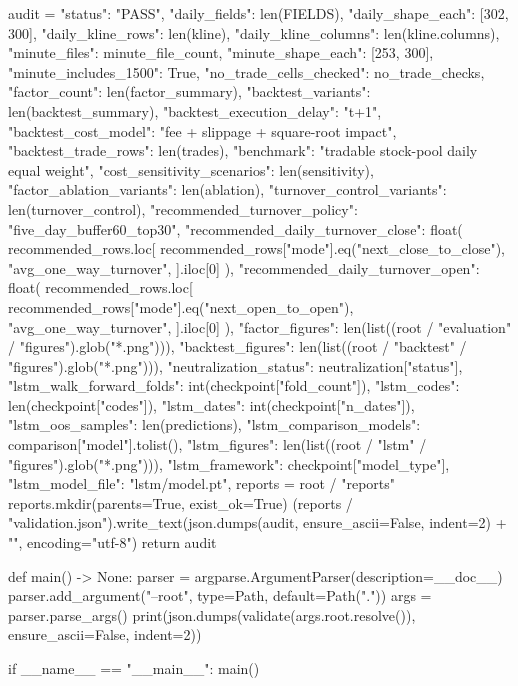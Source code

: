 \documentclass[UTF8,a4paper,fontset=fandol]{ctexart}
\begin{document}
\begin{ProjectCode}
    audit = {
        "status": "PASS",
        "daily_fields": len(FIELDS),
        "daily_shape_each": [302, 300],
        "daily_kline_rows": len(kline),
        "daily_kline_columns": len(kline.columns),
        "minute_files": minute_file_count,
        "minute_shape_each": [253, 300],
        "minute_includes_1500": True,
        "no_trade_cells_checked": no_trade_checks,
        "factor_count": len(factor_summary),
        "backtest_variants": len(backtest_summary),
        "backtest_execution_delay": "t+1",
        "backtest_cost_model": "fee + slippage + square-root impact",
        "backtest_trade_rows": len(trades),
        "benchmark": "tradable stock-pool daily equal weight",
        "cost_sensitivity_scenarios": len(sensitivity),
        "factor_ablation_variants": len(ablation),
        "turnover_control_variants": len(turnover_control),
        "recommended_turnover_policy": "five_day_buffer60_top30",
        "recommended_daily_turnover_close": float(
            recommended_rows.loc[
                recommended_rows["mode"].eq("next_close_to_close"),
                "avg_one_way_turnover",
            ].iloc[0]
        ),
        "recommended_daily_turnover_open": float(
            recommended_rows.loc[
                recommended_rows["mode"].eq("next_open_to_open"),
                "avg_one_way_turnover",
            ].iloc[0]
        ),
        "factor_figures": len(list((root / "evaluation" / "figures").glob("*.png"))),
        "backtest_figures": len(list((root / "backtest" / "figures").glob("*.png"))),
        "neutralization_status": neutralization["status"],
        "lstm_walk_forward_folds": int(checkpoint["fold_count"]),
        "lstm_codes": len(checkpoint["codes"]),
        "lstm_dates": int(checkpoint["n_dates"]),
        "lstm_oos_samples": len(predictions),
        "lstm_comparison_models": comparison["model"].tolist(),
        "lstm_figures": len(list((root / "lstm" / "figures").glob("*.png"))),
        "lstm_framework": checkpoint["model_type"],
        "lstm_model_file": "lstm/model.pt",
    }
    reports = root / "reports"
    reports.mkdir(parents=True, exist_ok=True)
    (reports / "validation.json").write_text(json.dumps(audit, ensure_ascii=False, indent=2) + "\n",
                                              encoding="utf-8")
    return audit


def main() -> None:
    parser = argparse.ArgumentParser(description=__doc__)
    parser.add_argument("--root", type=Path, default=Path("."))
    args = parser.parse_args()
    print(json.dumps(validate(args.root.resolve()), ensure_ascii=False, indent=2))


if __name__ == "__main__":
    main()
\end{ProjectCode}
\clearpage
\end{document}
